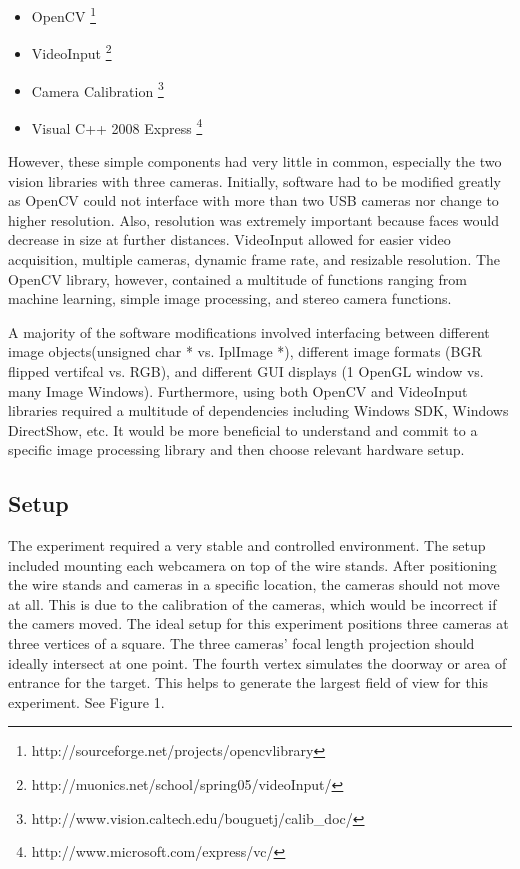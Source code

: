 \documentclass{acm_proc_article-sp}
\begin{document}
\begin{itemize}
\item OpenCV \footnote{http://sourceforge.net/projects/opencvlibrary}
\item VideoInput \footnote{http://muonics.net/school/spring05/videoInput/}
\item Camera Calibration \footnote{http://www.vision.caltech.edu/bouguetj/calib\_doc/}
\item Visual C++ 2008 Express \footnote{http://www.microsoft.com/express/vc/}
\end{itemize}

However, these simple components had very little in common, especially the two vision libraries with three cameras.
Initially, software had to be modified greatly as OpenCV could not interface with more than two USB cameras nor change to higher resolution.
Also, resolution was extremely important because faces would decrease in size at further distances.  VideoInput allowed for
easier video acquisition, multiple cameras, dynamic frame rate, and resizable resolution.  The OpenCV library, however, contained a multitude of functions
ranging from machine learning, simple image processing, and stereo camera functions.

A majority of the software modifications involved interfacing between different image objects(unsigned char * vs. IplImage *), 
different image formats (BGR flipped vertifcal vs. RGB), and different GUI displays (1 OpenGL window vs. many Image Windows).
Furthermore, using both OpenCV and VideoInput libraries required a multitude of dependencies including Windows SDK, Windows DirectShow, etc.
It would be more beneficial to understand and commit to a specific image processing library and then choose relevant hardware setup.

\subsection{Setup}
The experiment required a very stable and controlled environment.  The setup included mounting each webcamera on top of the wire stands.
After positioning the wire stands and cameras in a specific location, the cameras should not move at all.  
This is due to the calibration of the cameras, which would be incorrect if the camers moved.  The ideal setup for this experiment positions
three cameras at three vertices of a square.  The three cameras' focal length projection should ideally intersect at one point.  The fourth vertex simulates the doorway or area of entrance for the target.  This helps to generate the largest field of view for this experiment.  See Figure 1.
\end{document}
